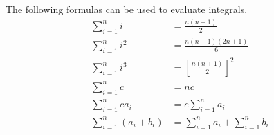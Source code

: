 \begin{frame}
The following formulas can be used to evaluate integrals.
\begin{align*}
\sum_{i=1}^n i & =  \frac{n(n+1)}{2}\\
\sum_{i=1}^n i^2 & =  \frac{n(n+1)(2n+1)}{6}\\
\sum_{i=1}^n i^3 & =  \left[\frac{n(n+1)}{2}\right]^2\\
\sum_{i=1}^n c & =  nc\\
\sum_{i=1}^n ca_i & =  c\sum_{i=1}^n a_i\\
\sum_{i=1}^n (a_i+b_i) & =  \sum_{i=1}^n a_i + \sum_{i=1}^n b_i
\end{align*}
\end{frame}
